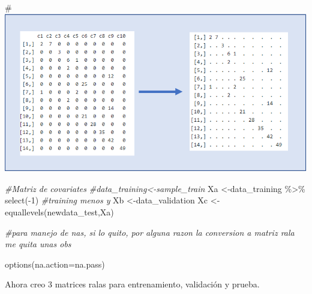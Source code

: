 \documentclass[
]{article}
\newenvironment{Shaded}{\begin{snugshade}}{\end{snugshade}}
\newcommand{\AttributeTok}[1]{\textcolor[rgb]{0.77,0.63,0.00}{#1}}
\newcommand{\CommentTok}[1]{\textcolor[rgb]{0.56,0.35,0.01}{\textit{#1}}}
\newcommand{\DecValTok}[1]{\textcolor[rgb]{0.00,0.00,0.81}{#1}}
\newcommand{\FunctionTok}[1]{\textcolor[rgb]{0.00,0.00,0.00}{#1}}
\newcommand{\NormalTok}[1]{#1}
\newcommand{\OtherTok}[1]{\textcolor[rgb]{0.56,0.35,0.01}{#1}}
\newcommand{\SpecialCharTok}[1]{\textcolor[rgb]{0.00,0.00,0.00}{#1}}
\newcommand{\StringTok}[1]{\textcolor[rgb]{0.31,0.60,0.02}{#1}}
\begin{document}
\#\includegraphics{ralas.png}

\begin{Shaded}
\begin{Highlighting}[]
\CommentTok{\#Matriz de covariates}
\CommentTok{\#data\_training\textless{}{-}sample\_train}
\NormalTok{Xa }\OtherTok{\textless{}{-}}\NormalTok{data\_training }\SpecialCharTok{\%\textgreater{}\%} \FunctionTok{select}\NormalTok{(}\SpecialCharTok{{-}}\DecValTok{1}\NormalTok{) }\CommentTok{\#training menos y}
\NormalTok{Xb }\OtherTok{\textless{}{-}}\NormalTok{data\_validation}
\NormalTok{Xc }\OtherTok{\textless{}{-}}\FunctionTok{equallevels}\NormalTok{(newdata\_test,Xa)}

\CommentTok{\#para manejo de nas, si lo quito, por alguna razon la conversion a matriz rala me quita unas obs}

\FunctionTok{options}\NormalTok{(}\AttributeTok{na.action=}\StringTok{\textquotesingle{}na.pass\textquotesingle{}}\NormalTok{)}
\end{Highlighting}
\end{Shaded}

Ahora creo 3 matrices ralas para entrenamiento, validación y prueba.

\begin{Shaded}
\end{Shaded}
\end{document}
